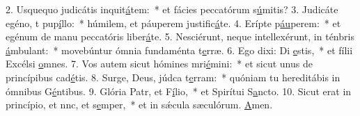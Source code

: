 2. Usquequo judicátis inquit\uline{á}tem:~* et fácies peccatórum s\uline{ú}mitis?
3. Judicáte egéno, t pup\uline{í}llo:~* húmilem, et páuperem justific\uline{á}te.
4. Erípte p\uline{áu}perem:~* et egénum de manu peccatóris liber\uline{á}te.
5. Nesciérunt, neque intellexérunt, in ténbris \uline{á}mbulant:~* movebúntur ómnia fundaménta t\uline{e}rræ.
6. Ego dixi: Di \uline{e}stis,~* et fílii Excélsi \uline{o}mnes.
7. Vos autem sicut hómines mri\uline{é}mini:~* et sicut unus de princípibus cad\uline{é}tis.
8. Surge, Deus, júdca t\uline{e}rram:~* quóniam tu hereditábis in ómnibus G\uline{é}ntibus.
9. Glória Patr, et F\uline{í}lio,~* et Spirítui S\uline{a}ncto.
10. Sicut erat in princípio, et nnc, et s\uline{e}mper,~* et in sǽcula sæculórum. \uline{A}men.
